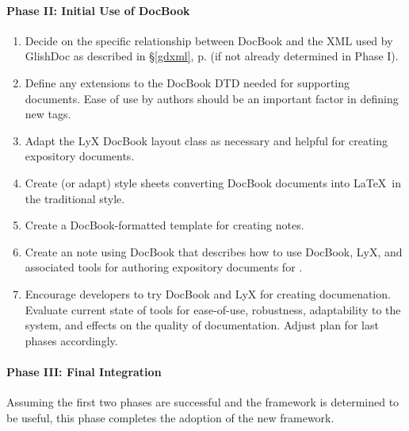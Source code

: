 \paragraph{Phase II: Initial Use of DocBook}

\begin{enumerate} 

\item Decide on the specific relationship between DocBook and the XML
used by GlishDoc as described in \S\ref{gdxml}, p. \pageref{pg-gdxml} (if
not already determined in Phase I).  

\item Define any extensions to the DocBook DTD needed for supporting
\aipspp documents.  Ease of use by authors should be an important
factor in defining new tags.

\item Adapt the LyX DocBook layout class as necessary and helpful for
creating \aipspp expository documents.

\item Create (or adapt) style sheets converting DocBook documents into
\LaTeX\ in the traditional \aipspp style.  

\item Create a DocBook-formatted template for creating \aipspp notes.  

\item Create an \aipspp note using DocBook that describes how to use
DocBook, LyX, and associated tools for authoring expository documents
for \aipspp.  

\item Encourage developers to try DocBook and LyX for creating
documenation.  Evaluate current state of tools for ease-of-use,
robustness, adaptability to the \aipspp system, and effects on the
quality of documentation.  Adjust plan for last phases accordingly.

\end{enumerate}

\paragraph{Phase III: Final Integration}  

Assuming the first two phases are successful and the framework is
determined to be useful, this phase completes the adoption of the new
framework.  


